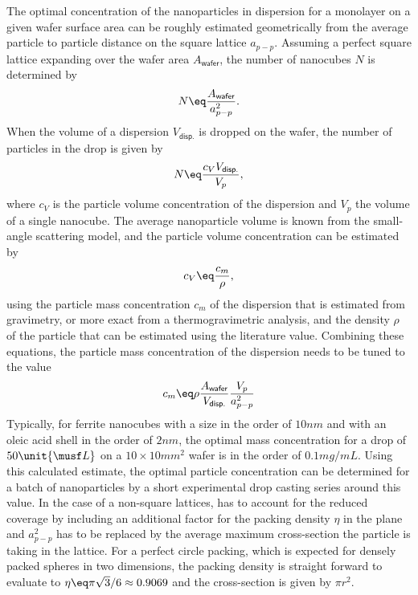 \documentclass[\main/dresen_thesis.tex]{subfiles}
\begin{document}
  The optimal concentration of the nanoparticles in dispersion for a monolayer on a given wafer surface area can be roughly estimated geometrically from the average particle to particle distance on the square lattice $a_{p-p}$.
  Assuming a perfect square lattice expanding over the wafer area $A_{\textsf{wafer}}$, the number of nanocubes $N$ is determined by
  \begin{align}
    N \eq \frac{A_{\textsf{wafer}}}{a_{p-p}^2}.
  \end{align}
  When the volume of a dispersion $V_{\textsf{disp.}}$ is dropped on the wafer, the number of particles in the drop is given by
  \begin{align}
    N \eq \frac{c_V V_{\textsf{disp.}}}{V_p},
  \end{align}
  where $c_V$ is the particle volume concentration of the dispersion and $V_p$ the volume of a single nanocube.
  The average nanoparticle volume is known from the small-angle scattering model, and the particle volume concentration can be estimated by
  \begin{align}
    c_V \eq \frac{c_m}{\rho},
  \end{align}
  using the particle mass concentration $c_m$ of the dispersion that is estimated from gravimetry, or more exact from a thermogravimetric analysis, and the density $\rho$ of the particle that can be estimated using the literature value.
  Combining these equations, the particle mass concentration of the dispersion needs to be tuned to the value
  \begin{align}\label{eq:monolayers:preparation:particleConcentration}
    c_m \eq \rho \frac{A_{\textsf{wafer}}}{V_{\textsf{disp.}}} \frac{V_p}{a_{p-p}^2}
  \end{align}
  Typically, for ferrite nanocubes with a size in the order of $10 \unit{nm}$ and with an oleic acid shell in the order of $2 \unit{nm}$, the optimal mass concentration for a drop of $50 \unit{\musf L}$ on a $10\times 10 \unit{mm^2}$ wafer is in the order of $0.1 \unit{mg/mL}$.
  Using this calculated estimate, the optimal particle concentration can be determined for a batch of nanoparticles by a short experimental drop casting series around this value.
  In the case of a non-square lattices,  has to account for the reduced coverage by including an additional factor for the packing density $\eta$ in the plane and $a_{p-p}^2$ has to be replaced by the average maximum cross-section the particle is taking in the lattice.
  For a perfect circle packing, which is expected for densely packed spheres in two dimensions, the packing density is straight forward to evaluate to $\eta \eq \pi \sqrt{3} / 6 \approx 0.9069$ and the cross-section is given by $\pi r^2$.
\end{document}
